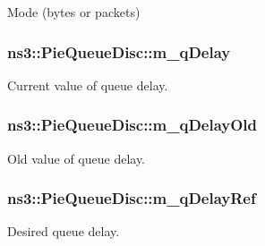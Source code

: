Mode (bytes or packets) 

\subsubsection[{\texorpdfstring{m\+\_\+q\+Delay}{m_qDelay}}]{ ns3\+::\+Pie\+Queue\+Disc\+::m\+\_\+q\+Delay\hspace{0.3cm}{\ttfamily [private]}}\hypertarget{classns3_1_1PieQueueDisc_ae255bc246482a1d19fe8548ad5500182}{}\label{classns3_1_1PieQueueDisc_ae255bc246482a1d19fe8548ad5500182}


Current value of queue delay. 

\subsubsection[{\texorpdfstring{m\+\_\+q\+Delay\+Old}{m_qDelayOld}}]{ ns3\+::\+Pie\+Queue\+Disc\+::m\+\_\+q\+Delay\+Old\hspace{0.3cm}{\ttfamily [private]}}\hypertarget{classns3_1_1PieQueueDisc_a4ea9c1bd8d6ae539f93822b8a47163bd}{}\label{classns3_1_1PieQueueDisc_a4ea9c1bd8d6ae539f93822b8a47163bd}


Old value of queue delay. 

\subsubsection[{\texorpdfstring{m\+\_\+q\+Delay\+Ref}{m_qDelayRef}}]{ ns3\+::\+Pie\+Queue\+Disc\+::m\+\_\+q\+Delay\+Ref\hspace{0.3cm}{\ttfamily [private]}}\hypertarget{classns3_1_1PieQueueDisc_aa5aef7970bc5164248e2bc2a4b024f60}{}\label{classns3_1_1PieQueueDisc_aa5aef7970bc5164248e2bc2a4b024f60}


Desired queue delay. 

